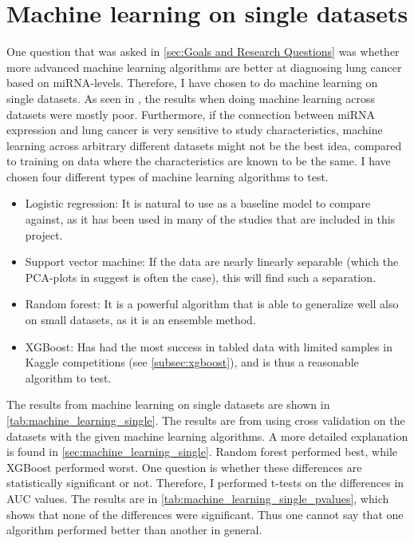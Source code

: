 {{{{{\section{Machine learning on single datasets}
\label{sec:res_machine_learning_single}
One question that was asked in \autoref{sec:Goals and Research Questions} was whether more advanced machine learning algorithms are better at diagnosing lung cancer based on miRNA-levels. Therefore, I have chosen to do machine learning on single datasets. As seen in \citet{forprosjekt}, the results when doing machine learning across datasets were mostly poor. Furthermore, if the connection between miRNA expression and lung cancer is very sensitive to study characteristics, machine learning across arbitrary different datasets might not be the best idea, compared to training on data where the characteristics are known to be the same. I have chosen four different types of machine learning algorithms to test.

\begin{itemize}
    \item Logistic regression: It is natural to use as a baseline model to compare against, as it has been used in many of the studies that are included in this project.
    \item Support vector machine: If the data are nearly linearly separable (which the PCA-plots in \citet{forprosjekt} suggest is often the case), this will find such a separation.
    \item Random forest: It is a powerful algorithm that is able to generalize well also on small datasets, as it is an ensemble method.
    \item XGBoost: Has had the most success in tabled data with limited samples in Kaggle competitions (see \autoref{subsec:xgboost}), and is thus a reasonable algorithm to test.
\end{itemize}

The results from machine learning on single datasets are shown in \autoref{tab:machine_learning_single}. The results are from using cross validation on the datasets with the given machine learning algorithms. A more detailed explanation is found in \autoref{sec:machine_learning_single}. Random forest performed best, while XGBoost performed worst. One question is whether these differences are statistically significant or not. Therefore, I performed t-tests on the differences in AUC values. The results are in \autoref{tab:machine_learning_single_pvalues}, which shows that none of the differences were significant. Thus one cannot say that one algorithm performed better than another in general.

}}}}}
